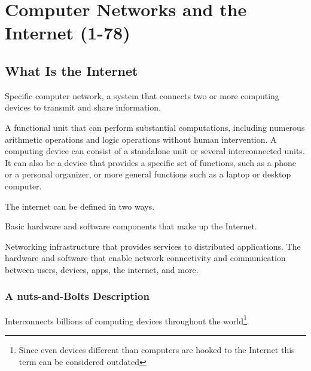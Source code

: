 \chapter{Computer Networks and the Internet (1-78)}



\section{What Is the Internet}

\begin{definition}\label{def:public_internet_1}
    Specific computer network, a system that connects two or more computing devices to transmit and share information.
\end{definition}

\begin{definition}\label{def:computing_device_1}
    A functional unit that can perform substantial computations, including numerous arithmetic operations and logic operations without human intervention. A computing device can consist of a standalone unit or several interconnected units. It can also be a device that provides a specific set of functions, such as a phone or a personal organizer, or more general functions such as a laptop or desktop computer. 
\end{definition}

\begin{definition*}
    The internet can be defined in two ways.
\begin{definition}\label{def:internet_def_1}
    Basic hardware and software components that make up the Internet.
  \end{definition}
  \begin{definition}\label{def:internet_def_2}
     Networking infrastructure that provides services to distributed applications. 
     The hardware and software that enable network connectivity and communication between users, devices, apps, the internet, and more.
  \end{definition}
\end{definition*}
\newpage

    \subsection{A nuts-and-Bolts Description}
        \begin{definition}\label{def:computer_network_1}
            Interconnects billions of computing devices throughout the world\footnote{Since even devices different than computers are hooked to the Internet this term can be considered outdated}.    
        \end{definition}

